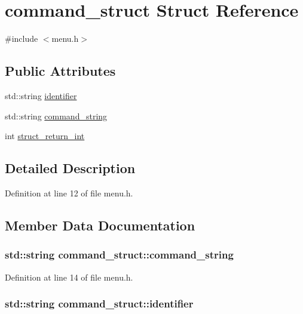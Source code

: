 \hypertarget{structcommand__struct}{\section{command\-\_\-struct Struct Reference}
\label{structcommand__struct}
}


{\ttfamily \#include $<$menu.\-h$>$}

\subsection*{Public Attributes}
\begin{DoxyCompactItemize}
\item 
std\-::string \hyperlink{structcommand__struct_ac3896bbb8dd9fa4b4b42cdadbede40c6}{identifier}
\item 
std\-::string \hyperlink{structcommand__struct_a9a985d9b578345128866e33fb2ab3224}{command\-\_\-string}
\item 
int \hyperlink{structcommand__struct_a4ffa2587b5988c5ed69bde2ef37475c0}{struct\-\_\-return\-\_\-int}
\end{DoxyCompactItemize}


\subsection{Detailed Description}


Definition at line 12 of file menu.\-h.



\subsection{Member Data Documentation}
\hypertarget{structcommand__struct_a9a985d9b578345128866e33fb2ab3224}{
\subsubsection[{command\-\_\-string}]{\setlength{\rightskip}{0pt plus 5cm}std\-::string command\-\_\-struct\-::command\-\_\-string}}\label{structcommand__struct_a9a985d9b578345128866e33fb2ab3224}


Definition at line 14 of file menu.\-h.

\hypertarget{structcommand__struct_ac3896bbb8dd9fa4b4b42cdadbede40c6}{
\subsubsection[{identifier}]{\setlength{\rightskip}{0pt plus 5cm}std\-::string command\-\_\-struct\-::identifier}}\label{structcommand__struct_ac3896bbb8dd9fa4b4b42cdadbede40c6}


